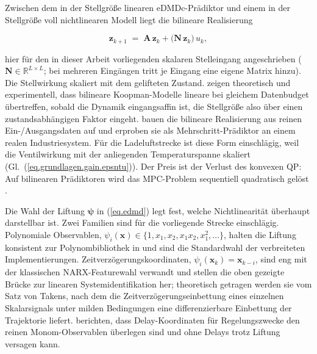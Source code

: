 Zwischen dem in der Stellgröße linearen eDMDc-Prädiktor und einem in
der Stellgröße voll nichtlinearen Modell liegt die bilineare
Realisierung

\begin{equation}
  \label{eq.edmd.bilinear}
  \mathbf z_{k+1} \;=\; \mathbf A\,\mathbf z_k
  + \bigl(\mathbf N\,\mathbf z_k\bigr)\,u_k,
\end{equation}

hier für den in dieser Arbeit vorliegenden skalaren Stelleingang
angeschrieben ($\mathbf N \in \mathbb R^{L\times L}$; bei mehreren
Eingängen tritt je Eingang eine eigene Matrix hinzu). Die Stellwirkung
skaliert mit dem gelifteten Zustand.
\cite{bruderAdvantagesBilinearKoopman2021} zeigen theoretisch und
experimentell, dass bilineare Koopman-Modelle lineare bei gleichem
Datenbudget übertreffen, sobald die Dynamik eingangsaffin ist, die
Stellgröße also über einen zustandsabhängigen Faktor eingeht.
\cite{yahagiGeneralizedBilinearKoopman2026} bauen die bilineare
Realisierung aus reinen Ein-/Ausgangsdaten auf und erproben sie als
Mehrschritt-Prädiktor an einem realen Industriesystem. Für die
Ladeluftstrecke ist diese Form einschlägig, weil die Ventilwirkung mit
der anliegenden Temperaturspanne skaliert
(Gl.~(\ref{eq.grundlagen.gain.epsntu})).
Der Preis ist der
Verlust des konvexen QP: Auf bilinearen Prädiktoren wird das
MPC-Problem sequentiell quadratisch gelöst
\cite{kelmanBilinearModelPredictive2011}.


Die Wahl der Liftung $\boldsymbol\psi$ in (\ref{eq.edmd}) legt fest, welche
Nichtlinearität überhaupt darstellbar ist. Zwei Familien sind für die
vorliegende Strecke einschlägig. Polynomiale Observablen,
$\psi_i(\mathbf x) \in \{1, x_1, x_2, x_1 x_2, x_1^2, \dots\}$, halten die
Liftung konsistent zur Polynombibliothek in \sindy{} und sind die
Standardwahl der verbreiteten Implementierungen.
Zeitverzögerungskoordinaten, $\psi_i(\mathbf x_k) = \mathbf x_{k-i}$, sind
eng mit der klassischen NARX-Featurewahl verwandt und stellen die oben
gezeigte Brücke zur linearen Systemidentifikation her; theoretisch getragen
werden sie vom Satz von Takens, nach dem die Zeitverzögerungseinbettung
eines einzelnen Skalarsignals unter milden Bedingungen eine
differenzierbare Einbettung der Trajektorie liefert.
\cite{bruntonModernKoopmanTheory2022} berichten, dass Delay-Koordinaten für
Regelungszwecke den reinen Monom-Observablen überlegen sind und \edmd{} ohne
Delays trotz Liftung versagen kann.

